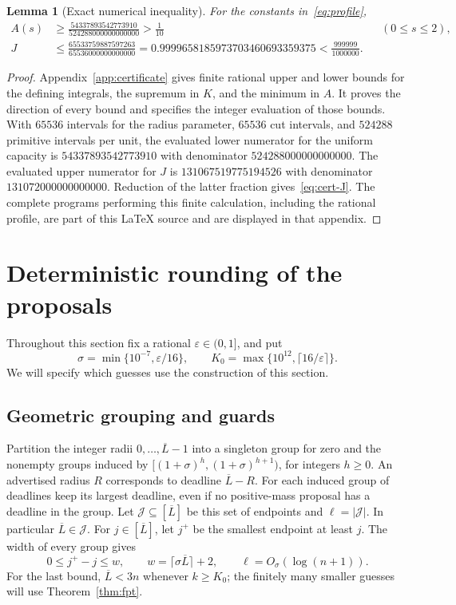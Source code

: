\documentclass[11pt]{article}
\numberwithin{equation}{section}
\newtheorem{lemma}[theorem]{Lemma}
\theoremstyle{definition}
\newcommand{\cL}{\overline L}
\begin{document}
\begin{lemma}[Exact numerical inequality]\label{lem:numerical}
For the constants in~\eqref{eq:profile},
\begin{align}
 A(s)&\ge\frac{54337893542773910}{524288000000000000}
           >\frac1{10} &&(0\le s\le2),\label{eq:cert-capacity}\\
 J&\le\frac{65533759887597263}{65536000000000000}
       =0.9999658185973703460693359375
       <\frac{999999}{1000000}.\label{eq:cert-J}
\end{align}
\end{lemma}
\begin{proof}
Appendix~\ref{app:certificate} gives finite rational upper and lower
bounds for the defining integrals, the supremum in $K$, and the minimum
in $A$. It proves the direction of every bound and specifies the integer
evaluation of those bounds. With $65536$ intervals for the radius parameter, $65536$ cut
intervals, and $524288$ primitive intervals per unit, the evaluated
lower numerator for the uniform capacity is $54337893542773910$ with
denominator $524288000000000000$. The evaluated upper numerator for
$J$ is $131067519775194526$ with denominator $131072000000000000$.
Reduction of the latter fraction gives~\eqref{eq:cert-J}.
The complete programs performing this finite calculation, including
the rational profile, are part of this LaTeX source and are displayed
in that appendix.
\end{proof}

\section{Deterministic rounding of the proposals}\label{sec:rounding}

Throughout this section fix a rational $\varepsilon\in(0,1]$, and put
\begin{equation}\label{eq:tolerance}
 \sigma=\min\{10^{-7},\varepsilon/16\},\qquad
 K_0=\max\{10^{12},\lceil16/\varepsilon\rceil\}.
\end{equation}
We will specify which guesses use the construction of this section.

\subsection{Geometric grouping and guards}

Partition the integer radii $0,\ldots,\cL-1$ into a singleton group for
zero and the nonempty groups induced by
$[(1+\sigma)^h,(1+\sigma)^{h+1})$, for integers $h\ge0$.
An advertised radius $R$ corresponds to deadline $\cL-R$.
For each induced group of deadlines keep its largest deadline, even if
no positive-mass proposal has a deadline in the group. Let
$\mathcal J\subseteq[\cL]$ be this set of endpoints and
$\ell=|\mathcal J|$. In particular $\cL\in\mathcal J$.
For $j\in[\cL]$, let $j^+$ be the smallest endpoint at least $j$.
The width of every group gives
\begin{equation}\label{eq:group-width}
 0\le j^+-j\le w,\qquad w=\lceil\sigma\cL\rceil+2,
 \qquad \ell=O_\sigma(\log(n+1)).
\end{equation}
For the last bound, $\cL<3n$ whenever $k\ge K_0$; the finitely many
smaller guesses will use Theorem~\ref{thm:fpt}.
\end{document}
